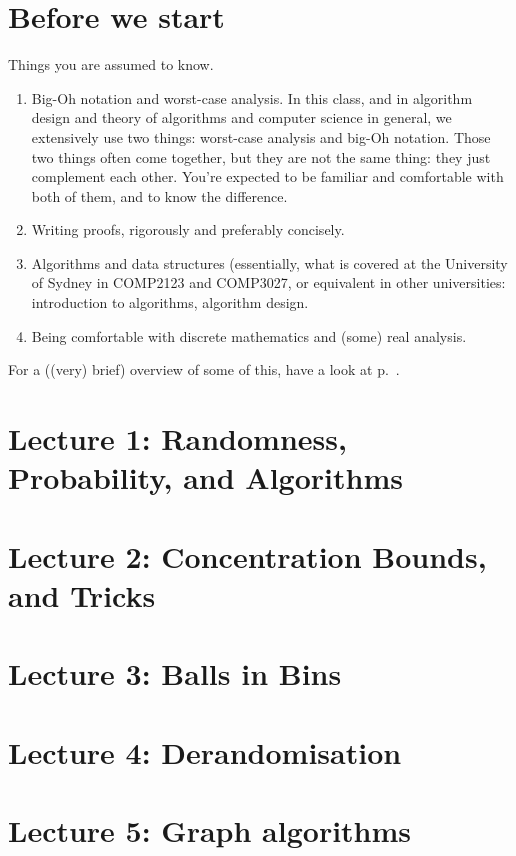 \documentclass[a4paper]{tufte-book}
\begin{document}
\mainmatter

\chapter*{Before we start}
Things you are assumed to know.
\begin{enumerate}
    \item Big-Oh notation and worst-case analysis. In this class, and in algorithm design and theory of algorithms and computer science in general,
we extensively use two things: worst-case analysis and big-Oh notation. Those two things often come together, but they are not the same thing: they just
complement each other. You're expected to be familiar and comfortable with both of them, and to know the difference.
    \item Writing proofs, rigorously and preferably concisely.
    \item Algorithms and data structures (essentially, what is covered at the University of Sydney in COMP2123 and COMP3027, or equivalent in other universities: introduction to algorithms, algorithm design.
    \item Being comfortable with discrete mathematics and (some) real analysis.
\end{enumerate}
For a ((very) brief) overview of some of this, have a look at p.~\pageref{chap:0}.

\chapter{Lecture 1: Randomness, Probability, and Algorithms}


\chapter{Lecture 2: Concentration Bounds, and Tricks}\label{chap:2}


\chapter{Lecture 3: Balls in Bins}


\chapter{Lecture 4: Derandomisation}


\chapter{Lecture 5: Graph algorithms}

\end{document}
